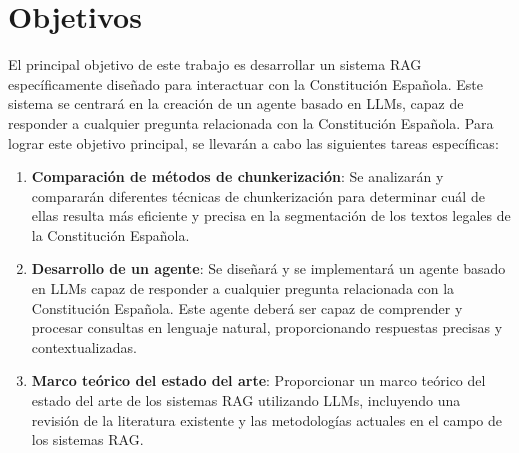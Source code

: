 \section{Objetivos}

El principal objetivo de este trabajo es desarrollar un sistema RAG específicamente diseñado para interactuar con la Constitución Española. Este sistema se centrará en la creación de un agente basado en LLMs, capaz de responder a cualquier pregunta relacionada con la Constitución Española. Para lograr este objetivo principal, se llevarán a cabo las siguientes tareas específicas:

\begin{enumerate}
    \item \textbf{Comparación de métodos de chunkerización}: Se analizarán y compararán diferentes técnicas de chunkerización para determinar cuál de ellas resulta más eficiente y precisa en la segmentación de los textos legales de la Constitución Española.

    \item \textbf{Desarrollo de un agente}: Se diseñará y se implementará un agente basado en LLMs capaz de responder a cualquier pregunta relacionada con la Constitución Española. Este agente deberá ser capaz de comprender y procesar consultas en lenguaje natural, proporcionando respuestas precisas y contextualizadas.
    
    \item \textbf{Marco teórico del estado del arte}: Proporcionar un marco teórico del estado del arte de los sistemas RAG utilizando LLMs, incluyendo una revisión de la literatura existente y las metodologías actuales en el campo de los sistemas RAG.
\end{enumerate}

